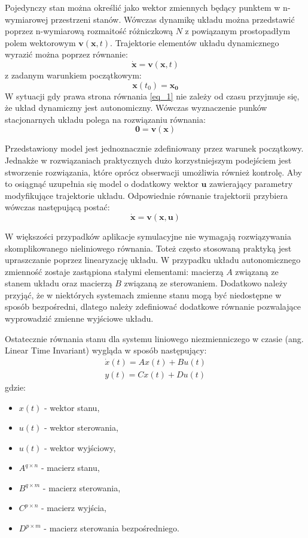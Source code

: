 \documentclass[12pt, twoside, openany]{report}
\theoremstyle{definition}
\begin{document}
Pojedynczy stan można określić jako wektor zmiennych będący punktem w n-wymiarowej przestrzeni stanów. Wówczas dynamikę układu można przedstawić poprzez n-wymiarową rozmaitość różniczkową \(N\) z powiązanym prostopadłym polem wektorowym \(\mathbf{v}(\mathbf{x},t)\). Trajektorie elementów układu dynamicznego wyrazić można poprzez równanie:
\begin{equation} \label{eq_1}
\dot{\mathbf{x}} = \mathbf{v}(\mathbf{x},t)
\end{equation}
z zadanym warunkiem początkowym:
\begin{equation}
\mathbf{x}(t_0) = \mathbf{x_0}
\end{equation}
W sytuacji gdy prawa strona równania \ref{eq_1} nie zależy od czasu przyjmuje się, że układ dynamiczny jest autonomiczny. Wówczas wyznaczenie punków stacjonarnych układu polega na rozwiązaniu równania:
\begin{equation}
\mathbf{0} = \mathbf{v}(\mathbf{x})
\end{equation}

Przedstawiony model jest jednoznacznie zdefiniowany przez warunek początkowy. Jednakże w rozwiązaniach praktycznych dużo korzystniejszym podejściem jest stworzenie rozwiązania, które oprócz obserwacji umożliwia również kontrolę. Aby to osiągnąć uzupełnia się model o dodatkowy wektor \(\mathbf{u}\) zawierający parametry modyfikujące trajektorie układu. Odpowiednie równanie trajektorii przybiera wówczas następującą postać:
\begin{equation}
\dot{\mathbf{x}} = \mathbf{v}(\mathbf{x},\mathbf{u})
\end{equation}

W większości przypadków aplikacje symulacyjne nie wymagają rozwiązywania skomplikowanego nieliniowego równania. Toteż często stosowaną praktyką jest upraszczanie poprzez linearyzację układu. W przypadku układu autonomicznego zmienność zostaje zastąpiona stałymi elementami: macierzą \(A\) związaną ze stanem układu oraz macierzą \(B\) związaną ze sterowaniem. Dodatkowo należy przyjąć, że w niektórych systemach zmienne stanu mogą być niedostępne w sposób bezpośredni, dlatego należy zdefiniować dodatkowe równanie pozwalające wyprowadzić zmienne wyjściowe układu.

Ostatecznie równania stanu dla systemu liniowego niezmienniczego w czasie (ang. Linear Time Invariant) wygląda w sposób następujący:
\begin{gather}
\dot{x}(t) = Ax(t) + Bu(t) \\
y(t) = Cx(t) + Du(t)
\end{gather}
gdzie:
\begin{itemize}
\item \(x(t)\) - wektor stanu,
\item \(u(t)\) - wektor sterowania,
\item \(u(t)\) - wektor wyjściowy,
\item \(A^{q \times n}\) - macierz stanu,
\item \(B^{q \times m}\) - macierz sterowania,
\item \(C^{p \times n}\) - macierz wyjścia,
\item \(D^{p \times m}\) - macierz sterowania bezpośredniego.
\end{itemize}
\end{document}
